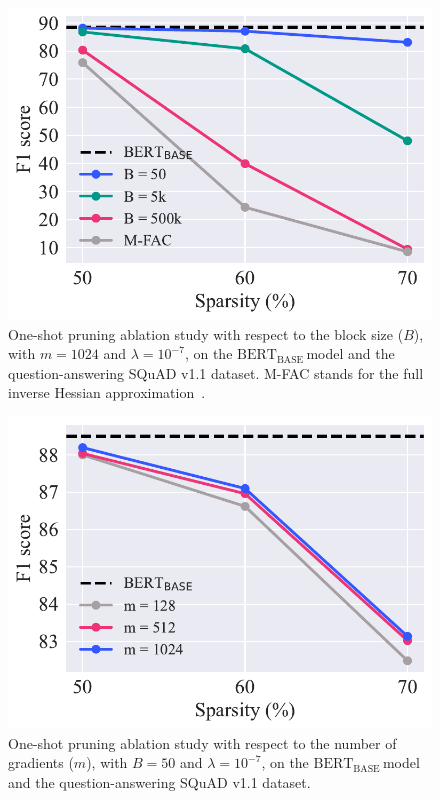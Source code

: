 \documentclass[11pt]{article}
\newcommand{\bert}{$\textrm{BERT}_{\textrm{BASE}}\,$}
\begin{document}
\begin{figure}
    \centering
    \includegraphics[scale=0.5]{media/ablation_B.pdf}
    \caption{One-shot pruning ablation study with respect to the block size ($B$), with $m = 1024$ and $\lambda = 10^{-7}$, on the \bert model and the question-answering SQuAD v1.1 dataset. M-FAC stands for the full inverse Hessian approximation~\cite{Frantar2021EfficientMA}.}
    \label{fig:ablation_B}
\end{figure}

\begin{figure}
    \centering
    \includegraphics[scale=0.5]{media/ablation_m.pdf}
    \caption{One-shot pruning ablation study with respect to the number of gradients ($m$), with $B = 50$ and $\lambda = 10^{-7}$, on the \bert model and the question-answering SQuAD v1.1 dataset.}
    \label{fig:ablation_m}
\end{figure}
\end{document}

